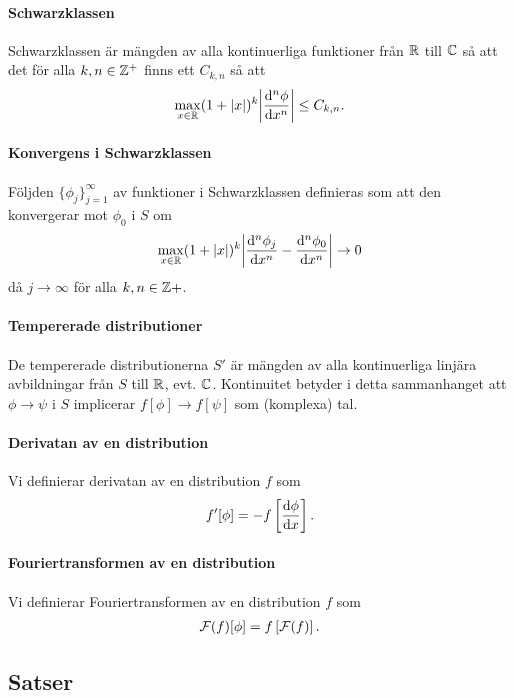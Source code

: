 \paragraph{Schwarzklassen}
Schwarzklassen är mängden av alla kontinuerliga funktioner från $\mathbb{R}$ till $\mathbb{C}$ så att det för alla $k, n\in\mathbb{Z}^{+}$ finns ett $C_{k, n}$ så att
\begin{align*}
	\max\limits_{x\in\mathbb{R}}(1 + \abs{x})^{k}\abs{\dv[n]{\phi}{x} (x)} \leq C_{k, n}.
\end{align*}

\paragraph{Konvergens i Schwarzklassen}
Följden $\{\phi_{j}\}_{j = 1}^{\infty}$ av funktioner i Schwarzklassen definieras som att den konvergerar mot $\phi_{0}$ i $S$ om
\begin{align*}
	\max\limits_{x\in\mathbb{R}}(1 + \abs{x})^{k}\abs{\dv[n]{\phi_{j}}{x} (x) - \dv[n]{\phi_{0}}{x} (x)}\to 0
\end{align*}
då $j\to\infty$ för alla $k, n\in\mathbb{Z}{+}$.

\paragraph{Tempererade distributioner}
De tempererade distributionerna $S'$ är mängden av alla kontinuerliga linjära avbildningar från $S$ till $\mathbb{R}$, evt. $\mathbb{C}$. Kontinuitet betyder i detta sammanhanget att $\phi\to\psi$ i $S$ implicerar $f[\phi]\to f[\psi]$ som (komplexa) tal.

\paragraph{Derivatan av en distribution}
Vi definierar derivatan av en distribution $f$ som
\begin{align*}
	f'[\phi] = - f\left[\dv{\phi}{x}\right].
\end{align*}

\paragraph{Fouriertransformen av en distribution}
Vi definierar Fouriertransformen av en distribution $f$ som
\begin{align*}
	\mathcal{F}(f)[\phi] = f\left[\mathcal{F}(f)\right].
\end{align*}

\subsection{Satser}

